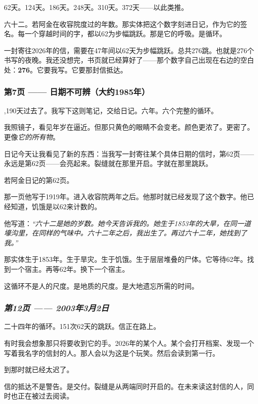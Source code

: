 \noindent 62天。124天。186天。248天。310天。372天——以此类推。

\noindent 六十二。若阿金在收容院度过的年数。那实体把这个数字刻进日记，作为它的签名。每一个穿越时间的字，都以62为步幅跳跃。那是它的呼吸。是循环。

\noindent 一封寄往2026年的信，需要在47年间以62天为步幅跳跃。总共276跳。也就是276个书写的夜晚。我还没想完，书页就已经算好了——那个数字自己出现在右边的空白处：\textbf{276}。它要我写。它要那封信抵达。

\subsubsection*{第7页 —— 日期不可辨（大约1985年）}

,190天过去了。我写下这则笔记，交给日记。六年。六个完整的循环。

\noindent 我照镜子，看见年岁在逼近。但那只黄色的眼睛不会变老。颜色更浓了。更密了。更像\textit{它的所有物}。

\noindent 日记今天让我看见了新的东西：当我写一封寄往某个具体日期的信时，第62页——永远是第62页——会亮起来。裂缝就在那里开启。字就在那里跳跃。

\noindent 若阿金日记的第62页。

\noindent 那一页他写于1919年。进入收容院两年之后。他那时就已经发现了这个数字。他已经知道，饥饿是以62来计数的。

\noindent 他写道：\textit{\textquotedblleft{}六十二是她的岁数。她今天告诉我的。她生于1853年的大旱，在同一道壕沟里，在同样的气味中。六十二年之后，我出生了。再过六十二年，她找到了我。\textquotedblright{}}

\noindent 那实体生于1853年。生于旱灾。生于饥饿。生于层层堆叠的尸体。它等待62年。找到一个宿主。再等62年。换下一个宿主。

\noindent 这循环不是人的尺度。是地质的尺度。是大地遗忘所需的时间。

\subsubsection*{\textit{第12页 —— 2003年3月2日}}

\noindent 二十四年的循环。151次62天的跳跃。信正在路上。

\noindent 有时我会想象那只将要收到它的手。2026年的某个人。某个会打开档案、发现一个写着我名字的信封的人。那人会以为这是个玩笑。然后会读到第一行。

\noindent 到那时就已经太迟了。

\noindent 信的抵达不是警告。是交付。裂缝是从两端同时开启的。在未来读这封信的人，同时也正在被过去阅读。

